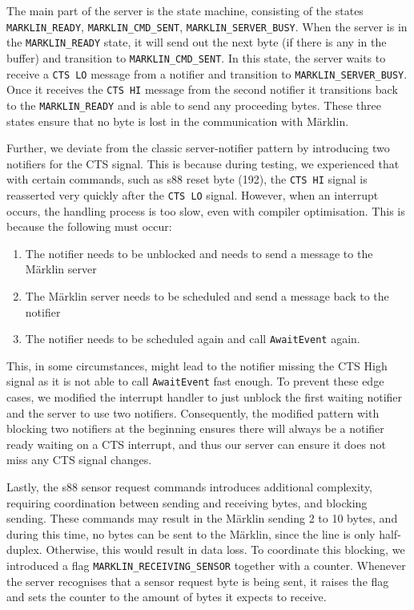 \documentclass[12pt, titlepage]{article}
\begin{document}
    The main part of the server is the state machine, consisting of the states \verb`MARKLIN_READY`, \verb`MARKLIN_CMD_SENT`, \verb`MARKLIN_SERVER_BUSY`.
    When the server is in the \verb`MARKLIN_READY` state, it will send out the next byte (if there is any in the buffer) and transition to \verb`MARKLIN_CMD_SENT`. 
    In this state, the server waits to receive a \verb`CTS LO` message from a notifier and transition to \verb`MARKLIN_SERVER_BUSY`. 
    Once it receives the \verb`CTS HI` message from the second notifier it transitions back to the \verb`MARKLIN_READY` and is able to send any proceeding bytes.
    These three states ensure that no byte is lost in the communication with Märklin. 
    
    Further, we deviate from the classic server-notifier pattern by introducing two notifiers for the CTS signal.
    This is because during testing, we experienced that with certain commands, such as s88 reset byte (192), the \verb`CTS HI` signal is reasserted very quickly after the \verb`CTS LO` signal.
    However, when an interrupt occurs, the handling process is too slow, even with compiler optimisation. This is because the following must occur:
    \begin{enumerate}[(1)]
        \item The notifier needs to be unblocked and needs to send a message to the Märklin server
        \item The Märklin server needs to be scheduled and send a message back to the notifier
        \item The notifier needs to be scheduled again and call \verb'AwaitEvent' again. 
    \end{enumerate}
    This, in some circumstances, might lead to the notifier missing the CTS High signal as it is not able to call \verb`AwaitEvent` fast enough. 
    To prevent these edge cases, we modified the interrupt handler to just unblock the first waiting notifier and the server to use two notifiers. 
    Consequently, the modified pattern with blocking two notifiers at the beginning ensures there will always be a notifier ready waiting on a CTS interrupt, and thus our server can ensure it does not miss any CTS signal changes.
    
    Lastly, the s88 sensor request commands introduces additional complexity, requiring coordination between sending and receiving bytes, and blocking sending.
    These commands may result in the Märklin sending 2 to 10 bytes, and during this time, no bytes can be sent to the Märklin, since the line is only half-duplex. 
    Otherwise, this would result in data loss. To coordinate this blocking, we introduced a flag \verb'MARKLIN_RECEIVING_SENSOR' together with a counter. 
    Whenever the server recognises that a sensor request byte is being sent, it raises the flag and sets the counter to the amount of bytes it expects to receive. 
    
\end{document}
